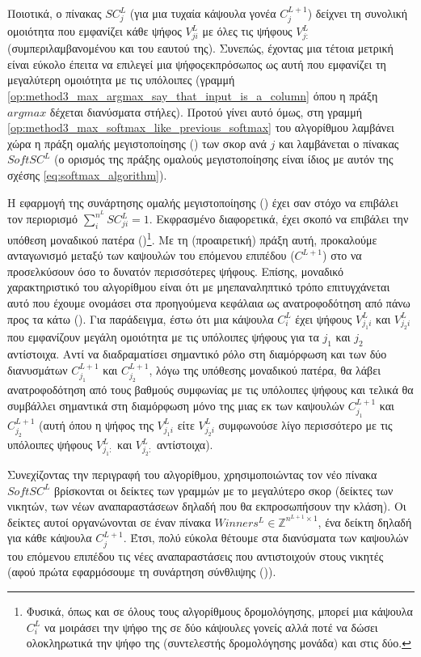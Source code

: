 Ποιοτικά, ο πίνακας $SC^L_j$ (για μια τυχαία κάψουλα γονέα $C_j^{L+1}$) δείχνει τη συνολική ομοιότητα που εμφανίζει κάθε ψήφος $V_{ji}^L$ με όλες τις ψήφους $V_{j:}^L$ (συμπεριλαμβανομένου και του εαυτού της). Συνεπώς, έχοντας μια τέτοια μετρική είναι εύκολο έπειτα να επιλεγεί μια ψήφος\textendash εκπρόσωπος ως αυτή που εμφανίζει τη μεγαλύτερη ομοιότητα με τις υπόλοιπες (γραμμή \ref{op:method3_max_argmax_say_that_input_is_a_column} όπου η πράξη $argmax$ δέχεται διανύσματα στήλες). Προτού γίνει αυτό όμως, στη γραμμή \ref{op:method3_max_softmax_like_previous_softmax} του αλγορίθμου λαμβάνει χώρα η πράξη ομαλής μεγιστοποίησης () των σκορ ανά $j$ και λαμβάνεται ο πίνακας $SoftSC^L$ (ο ορισμός της πράξης ομαλούς μεγιστοποίησης είναι ίδιος με αυτόν της σχέσης \ref{eq:softmax_algorithm}).\par

Η εφαρμογή της συνάρτησης ομαλής μεγιστοποίησης () έχει σαν στόχο να επιβάλει τον περιορισμό $\sum_i^{n^L} SC_{ji}^L = 1$. Εκφρασμένο διαφορετικά, έχει σκοπό να επιβάλει την υπόθεση μοναδικού πατέρα ()\footnote{Φυσικά, όπως και σε όλους τους αλγορίθμους δρομολόγησης, μπορεί μια κάψουλα $C_i^L$ να μοιράσει την ψήφο της σε δύο κάψουλες γονείς αλλά ποτέ να δώσει ολοκληρωτικά την ψήφο της (συντελεστής δρομολόγησης μονάδα) και στις δύο.}. Με τη (προαιρετική) πράξη αυτή, προκαλούμε ανταγωνισμό μεταξύ των καψουλών του επόμενου επιπέδου ($C^{L+1}$) στο να προσελκύσουν όσο το δυνατόν περισσότερες ψήφους. Επίσης, μοναδικό χαρακτηριστικό του αλγορίθμου είναι ότι με μη\textendash επαναληπτικό τρόπο επιτυγχάνεται αυτό που έχουμε ονομάσει στα προηγούμενα κεφάλαια ως ανατροφοδότηση από πάνω προς τα κάτω (). Για παράδειγμα, έστω ότι μια κάψουλα $C_i^L$ έχει ψήφους $V_{j_1i}^L$ και $V_{j_2i}^L$ που εμφανίζουν μεγάλη ομοιότητα με τις υπόλοιπες ψήφους για τα $j_1$ και $j_2$ αντίστοιχα. Αντί να διαδραματίσει σημαντικό ρόλο στη διαμόρφωση και των δύο διανυσμάτων $C_{j_1}^{L+1}$ και $C_{j_2}^{L+1}$, λόγω της υπόθεσης μοναδικού πατέρα, θα λάβει ανατροφοδότηση από τους βαθμούς συμφωνίας με τις υπόλοιπες ψήφους και τελικά θα συμβάλλει σημαντικά στη διαμόρφωση μόνο της μιας εκ των καψουλών $C_{j_1}^{L+1}$ και $C_{j_2}^{L+1}$ (αυτή όπου η ψήφος της $V_{j_1i}^L$ είτε $V_{j_2i}^L$ συμφωνούσε λίγο περισσότερο με τις υπόλοιπες ψήφους $V_{j_1:}^L$ και $V_{j_2:}^L$ αντίστοιχα).\par

Συνεχίζοντας την περιγραφή του αλγορίθμου, χρησιμοποιώντας τον νέο πίνακα $ SoftSC^L $ βρίσκονται οι δείκτες των γραμμών με το μεγαλύτερο σκορ (δείκτες των νικητών, των νέων αναπαραστάσεων δηλαδή που θα εκπροσωπήσουν την κλάση). Οι δείκτες αυτοί οργανώνονται σε έναν πίνακα $ Winners^L \in \mathbb{Z}^{n^{L+1}\times 1} $, ένα δείκτη δηλαδή για κάθε κάψουλα $C_j^{L+1}$. Έτσι, πολύ εύκολα θέτουμε στα διανύσματα των καψουλών του επόμενου επιπέδου τις νέες αναπαραστάσεις που αντιστοιχούν στους νικητές (αφού πρώτα εφαρμόσουμε τη συνάρτηση σύνθλιψης ()).\par

